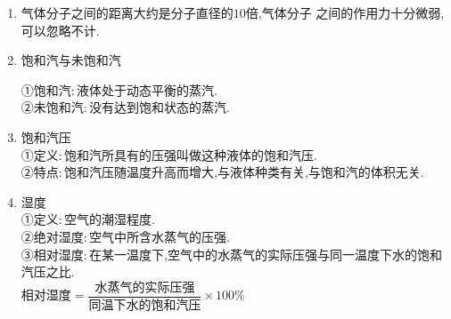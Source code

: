 \begin{enumerate}
\renewcommand{\labelenumii}{(\arabic{enumii})}

\item 
气体分子之间的距离大约是分子直径的$ 10 $倍,气体分子
之间的作用力十分微弱,可以忽略不计.

\item 
饱和汽与未饱和汽

①饱和汽$ : $液体处于动态平衡的蒸汽.\\
②未饱和汽$ : $没有达到饱和状态的蒸汽.

\item 
饱和汽压\\
①定义$ : $饱和汽所具有的压强叫做这种液体的饱和汽压.\\
②特点$ : $饱和汽压随温度升高而增大,与液体种类有关,与饱和汽的体积无关.

\item 
湿度\\
①定义$ : $空气的潮湿程度.\\
②绝对湿度$ : $空气中所含水蒸气的压强.\\
③相对湿度$ : $在某一温度下,空气中的水蒸气的实际压强与同一温度下水的饱和汽压之比.\\
$ \text{相对湿度} = \dfrac{\text{水蒸气的实际压强}}{\text{同温下水的饱和汽压}}\times 100 \% $

\end{enumerate}


